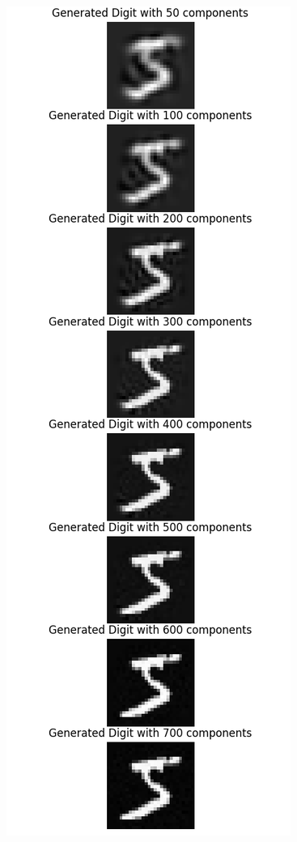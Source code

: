 \begin{frame}
\begin{columns}
\begin{column}{0.3\textwidth}
\begin{figure}
                \includegraphics[height=0.8\textheight]{media/3rdAssignment/PCA_components.png}
            \end{figure}
        \end{column}
    \end{columns}
\end{frame}

